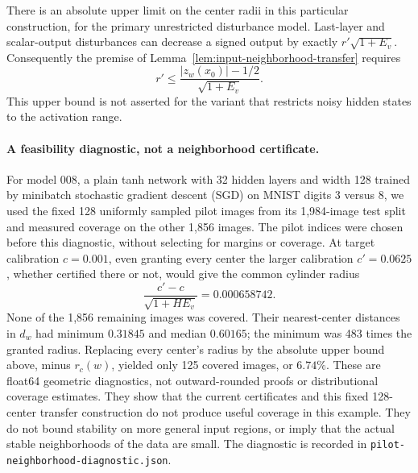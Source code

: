 There is an absolute upper limit on the center radii in this particular
construction, for the primary unrestricted disturbance model. Last-layer
and scalar-output disturbances can decrease a signed output by exactly
$r'\sqrt{1+E_v}$. Consequently the premise of
Lemma~\ref{lem:input-neighborhood-transfer} requires
\[
 r'\le\frac{|z_w(x_0)|-1/2}{\sqrt{1+E_v}}.
\]
This upper bound is not asserted for the variant that restricts noisy
hidden states to the activation range.

\paragraph{A feasibility diagnostic, not a neighborhood certificate.}
For model 008, a plain tanh network with 32 hidden layers and width 128
trained by minibatch stochastic gradient descent (SGD) on MNIST digits
3 versus 8, we used the fixed
128 uniformly sampled pilot images from its 1,984-image test split and
measured coverage on the other 1,856 images. The pilot indices were
chosen before this diagnostic, without selecting for margins or
coverage. At target calibration $c=0.001$, even granting every center
the larger calibration $c'=0.0625$, whether certified there or not,
would give the common cylinder radius
\[
 \frac{c'-c}{\sqrt{1+HE_v}}=0.000658742.
\]
None of the 1,856 remaining images was covered. Their nearest-center
distances in $d_w$ had minimum $0.31845$ and median $0.60165$; the
minimum was 483 times the granted radius. Replacing every center's
radius by the absolute upper bound above, minus $r_c(w)$, yielded only
125 covered images, or $6.74\%$. These are float64 geometric diagnostics,
not outward-rounded proofs or distributional coverage estimates. They
show that the current certificates and this fixed 128-center transfer
construction do not produce useful coverage in this example. They do
not bound stability on more general input regions, or imply that the
actual stable neighborhoods of the data are small. The diagnostic is
recorded in \texttt{pilot-neighborhood-diagnostic.json}.
